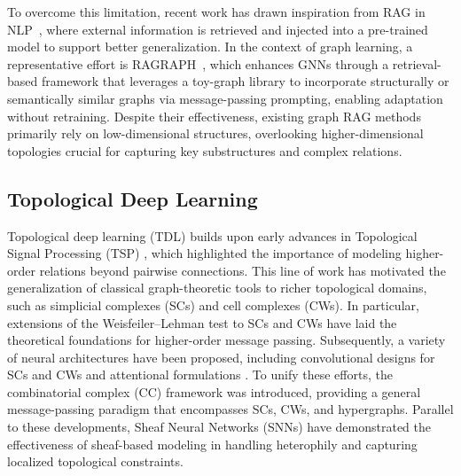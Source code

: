 To overcome this limitation, recent work has drawn inspiration from RAG in NLP~\cite{lewis2021retrievalaugmented,zhao2023retrieving}, where external information is retrieved and injected into a pre-trained model to support better generalization. In the context of graph learning, a representative effort is RAGRAPH~\cite{JiangQXZZ00X0W24}, which enhances GNNs through a retrieval-based framework that leverages a toy-graph library to incorporate structurally or semantically similar graphs via message-passing prompting, enabling adaptation without retraining. %
Despite their effectiveness, existing graph RAG methods primarily rely on low-dimensional structures, overlooking higher-dimensional topologies crucial for capturing key substructures and complex relations.


\subsection{Topological Deep Learning} 
Topological deep learning (TDL) builds upon early advances in Topological Signal Processing (TSP) \cite{barbarossa2020topological, schaub2021signal, roddenberry2022cellsp, sardellitti2022cell}, which highlighted the importance of modeling higher-order relations beyond pairwise connections. This line of work has motivated the generalization of classical graph-theoretic tools to richer topological domains, such as simplicial complexes (SCs) and cell complexes (CWs). In particular, extensions of the Weisfeiler–Lehman test to SCs and CWs \cite{bodnar2021weisfeiler, DBLP:conf/nips/BodnarFOWLMB21} have laid the theoretical foundations for higher-order message passing. Subsequently, a variety of neural architectures have been proposed, including convolutional designs for SCs and CWs \cite{ebli2020simplicial, yang2022effsimpl, hajij2020cell, yang2023convolutional, roddenberry2021principled, hajij2022} and attentional formulations \cite{goh2022simplicial, giusti2023cell}. To unify these efforts, the combinatorial complex (CC) framework \cite{hajij2023topological} was introduced, providing a general message-passing paradigm that encompasses SCs, CWs, and hypergraphs. Parallel to these developments, Sheaf Neural Networks (SNNs) \cite{HGh19, hansen2020sheaf, sheaf2022, battiloro2022tangent, battiloro2024tangent, barbero2022sheaf} have demonstrated the effectiveness of sheaf-based modeling in handling heterophily and capturing localized topological constraints.

